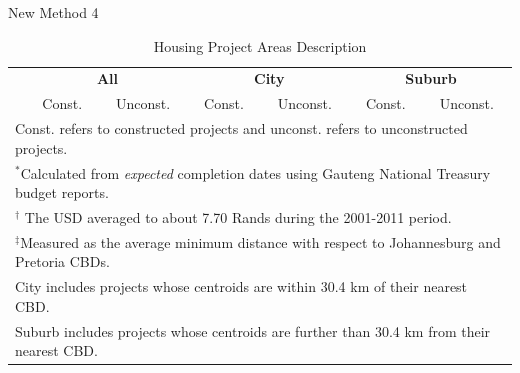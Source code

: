 \documentclass[12pt]{article}
\begin{document}
\Large New Method 4






\vspace{0mm}
\begin{table}[h!]
\centering
\caption{Housing Project Areas Description}\label{table:projectdescriptives}
\vspace{0mm}
\begin{tabular}{l*{1}{cccccc}}
\toprule
  & \multicolumn{2}{c}{\textbf{All}}& \multicolumn{2}{c}{\textbf{City}}  & \multicolumn{2}{c}{\textbf{Suburb}}   \\
  &Const. & Unconst. &Const. & Unconst.   & Const. & Unconst. \\
\midrule

\bottomrule
\multicolumn{7}{l}{\scriptsize Const. refers to constructed projects and unconst. refers to unconstructed projects.}\\[-.5em]
\multicolumn{7}{l}{\scriptsize $^*$Calculated from {\it expected} completion dates using Gauteng National Treasury budget reports.}\\[-.5em]
\multicolumn{7}{l}{\scriptsize $^\dagger$ The USD averaged to about 7.70 Rands during the 2001-2011 period.}\\[-.5em]
\multicolumn{7}{l}{\scriptsize $^\ddagger$Measured as the average minimum distance with respect to Johannesburg and Pretoria CBDs. } \\[-.5em]
\multicolumn{7}{l}{\scriptsize City includes projects whose centroids are within 30.4 km of their nearest CBD.} \\[-.5em]
\multicolumn{7}{l}{\scriptsize Suburb includes projects whose centroids are further than 30.4 km from their nearest CBD.}
\end{tabular}
\end{table} 
\end{document}
